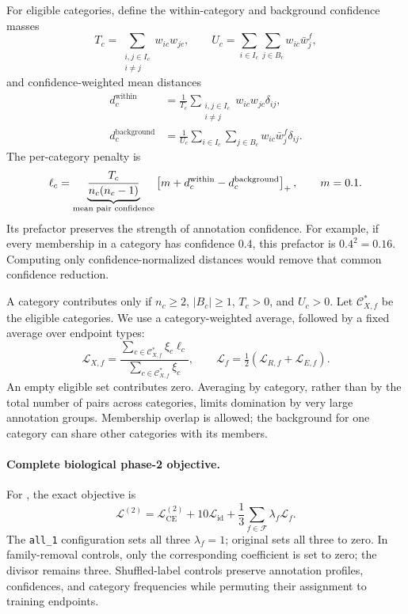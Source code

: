For eligible categories, define the within-category and background confidence
masses
\begin{equation}
  T_c=\sum_{\substack{i,j\in I_c\\i\ne j}}w_{ic}w_{jc},\qquad
  U_c=\sum_{i\in I_c}\sum_{j\in B_c}w_{ic}\bar w_j^f,
\end{equation}
and confidence-weighted mean distances
\begin{align}
  d_c^{\mathrm{within}}
    &=\frac{1}{T_c}
       \sum_{\substack{i,j\in I_c\\i\ne j}}w_{ic}w_{jc}\delta_{ij},\\
  d_c^{\mathrm{background}}
    &=\frac{1}{U_c}\sum_{i\in I_c}\sum_{j\in B_c}
          w_{ic}\bar w_j^f\delta_{ij}.
  \label{eq:v4-bio-distances}
\end{align}
The per-category penalty is
\begin{equation}
  \ell_c=\underbrace{\frac{T_c}{n_c(n_c-1)}}_{\text{mean pair confidence}}
       \left[m+d_c^{\mathrm{within}}-d_c^{\mathrm{background}}\right]_{+},
       \qquad m=0.1.
  \label{eq:v4-relative-bio}
\end{equation}
Its prefactor preserves the strength of annotation confidence. For example,
if every membership in a category has confidence 0.4, this prefactor is
$0.4^2=0.16$. Computing only confidence-normalized distances would remove
that common confidence reduction.

A category contributes only if $n_c\ge2$, $|B_c|\ge1$, $T_c>0$, and
$U_c>0$. Let $\mathcal C_{X,f}^{*}$ be the eligible categories. We use a
category-weighted average, followed by a fixed average over endpoint types:
\begin{equation}
  \mathcal L_{X,f}=
    \frac{\sum_{c\in\mathcal C_{X,f}^{*}}\xi_c\ell_c}
         {\sum_{c\in\mathcal C_{X,f}^{*}}\xi_c},\qquad
  \mathcal L_f=\tfrac12(\mathcal L_{R,f}+\mathcal L_{E,f}).
  \label{eq:v4-family-average}
\end{equation}
An empty eligible set contributes zero. Averaging by category, rather than
by the total number of pairs across categories, limits domination by very
large annotation groups. Membership overlap is allowed; the background for
one category can share other categories with its members.

\paragraph{Complete biological phase-2 objective.}
For \vfourBio, the exact objective is
\begin{equation}
  \boxed{\mathcal L^{(2)}=
     \mathcal L_{\mathrm{CE}}^{(2)}+10\mathcal L_{\mathrm{id}}
     +\frac13\sum_{f\in\mathcal F}\lambda_f\mathcal L_f.}
  \label{eq:v4-phase2-total}
\end{equation}
The \texttt{all\_1} configuration sets all three $\lambda_f=1$; original
\methodname sets all three to zero. In family-removal controls, only the
corresponding coefficient is set to zero; the divisor remains three.
Shuffled-label controls preserve annotation profiles, confidences, and
category frequencies while permuting their assignment to training endpoints.

